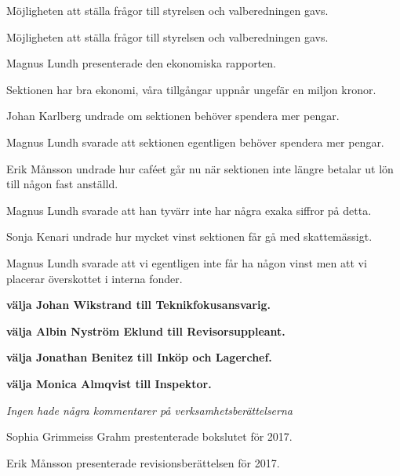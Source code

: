 \documentclass[10pt]{article}
\begin{document}
\begin{paragrafer}
	\Mbaby

	Möjligheten att ställa frågor till styrelsen och valberedningen gavs.

	Möjligheten att ställa frågor till styrelsen och valberedningen gavs.

	Magnus Lundh presenterade den ekonomiska rapporten.

	Sektionen har bra ekonomi, våra tillgångar uppnår ungefär en miljon kronor.

	Johan Karlberg undrade om sektionen behöver spendera mer pengar.

	Magnus Lundh svarade att sektionen egentligen behöver spendera mer pengar.

	Erik Månsson undrade hur caféet går nu när sektionen inte längre betalar ut lön till någon fast anställd.

	Magnus Lundh svarade att han tyvärr inte har några exaka siffror på detta.

	Sonja Kenari undrade hur mycket vinst sektionen får gå med skattemässigt.

	Magnus Lundh svarade att vi egentligen inte får ha någon vinst men att vi placerar överskottet i interna fonder.



	\textbf{\Mba välja Johan Wikstrand till Teknikfokusansvarig.}\par

	\textbf{\Mba välja Albin Nyström Eklund till Revisorsuppleant.}\par

	\textbf{\Mba välja Jonathan Benitez till Inköp och Lagerchef.}\par

	\textbf{\Mba välja Monica Almqvist till Inspektor.}\par



	\emph{Ingen hade några kommentarer på verksamhetsberättelserna}


	Sophia Grimmeiss Grahm prestenterade bokslutet för 2017.

	Erik Månsson presenterade revisionsberättelsen för 2017.


\end{paragrafer}
\end{document}
